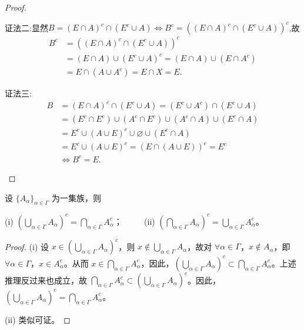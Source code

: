 \documentclass[../../main.tex]{subfiles}%
\begin{document}
\begin{proof}
\begin{enumerate}[(1)]
{\color{blue}证法二:}显然$B=(E\cap A)^c\cap (E^c\cup A)\Longleftrightarrow B^c=\left( (E\cap A)^c\cap (E^c\cup A) \right) ^c$,故
\begin{align*}
B^c&=\left( (E\cap A)^c\cap (E^c\cup A) \right) ^c
\\
&=(E\cap A)\cup (E^c\cup A)^c=(E\cap A)\cup (E\cap A^c)
\\
&=E\cap (A\cup A^c)=E\cap X=E.
\end{align*}

{\color{blue}证法三:}
\begin{align*}
B&=(E\cap A)^c\cap (E^c\cup A)=(E^c\cup A^c)\cap (E^c\cup A)
\\
&=(E^c\cap E^c)\cup (A^c\cap E^c)\cup (A^c\cap A)\cup (E^c\cap A)
\\
&=E^c\cup (A\cup E)^c\cup \varnothing \cup (E^c\cap A)
\\
&=E^c\cup (A\cup E)^c=(E\cap (A\cup E))^c=E^c
\\
&\Longleftrightarrow B^c=E.
\end{align*}
\end{enumerate}

\end{proof}

\begin{theorem}[De Morgan定律]\label{theorem:De Morgan定律}
设 \(\{A_{\alpha}\}_{\alpha \in \varGamma}\) 为一集族，则

(i) \((\bigcup_{\alpha \in \varGamma} A_{\alpha})^c = \bigcap_{\alpha \in \varGamma} A_{\alpha}^c\)；
$\quad \quad$
(ii) \((\bigcap_{\alpha \in \varGamma} A_{\alpha})^c = \bigcup_{\alpha \in \varGamma} A_{\alpha}^c\)。
\end{theorem}
\begin{proof}

(i) 设 \(x \in (\bigcup_{\alpha \in \varGamma} A_{\alpha})^c\)，则 \(x \notin \bigcup_{\alpha \in \varGamma} A_{\alpha}\)，故对 \(\forall \alpha \in \varGamma\)，\(x \notin A_{\alpha}\)，即 \(\forall \alpha \in \varGamma\)，\(x \in A_{\alpha}^c\)。从而 \(x \in \bigcap_{\alpha \in \varGamma} A_{\alpha}^c\)，因此，\((\bigcup_{\alpha \in \varGamma} A_{\alpha})^c \subset \bigcap_{\alpha \in \varGamma} A_{\alpha}^c\)。上述推理反过来也成立，故 \(\bigcap_{\alpha \in \varGamma} A_{\alpha}^c \subset (\bigcup_{\alpha \in \varGamma} A_{\alpha})^c\)。因此，\((\bigcup_{\alpha \in \varGamma} A_{\alpha})^c = \bigcap_{\alpha \in \varGamma} A_{\alpha}^c\)。

(ii) 类似可证。 

\end{proof}
\end{document}
